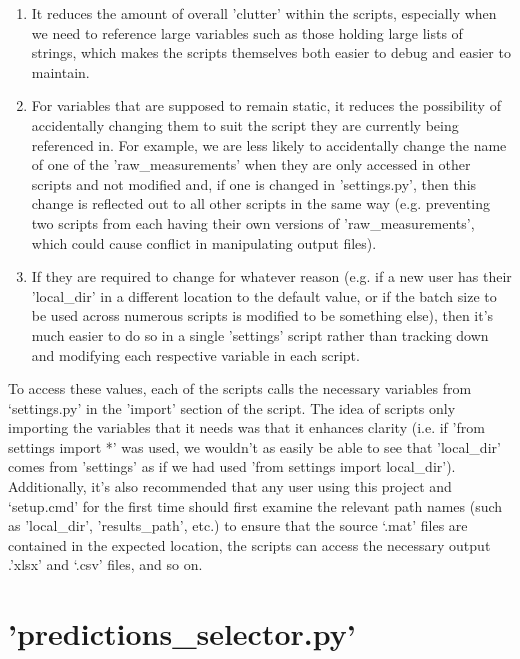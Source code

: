\documentclass[12pt,twoside]{report}
\begin{document}
\begin{enumerate}
	\item It reduces the amount of overall 'clutter' within the scripts, especially when we need to reference large variables such as those holding large lists of strings, which makes the scripts themselves both easier to debug and easier to maintain.
	\item For variables that are supposed to remain static, it reduces the possibility of accidentally changing them to suit the script they are currently being referenced in. For example, we are less likely to accidentally change the name of one of the 'raw\_measurements' when they are only accessed in other scripts and not modified and, if one is changed in 'settings.py', then this change is reflected out to all other scripts in the same way (e.g. preventing two scripts from each having their own versions of 'raw\_measurements', which could cause conflict in manipulating output files).
	\item If they are required to change for whatever reason (e.g. if a new user has their 'local\_dir' in a different location to the default value, or if the batch size to be used across numerous scripts is modified to be something else), then it's much easier to do so in a single 'settings' script rather than tracking down and modifying each respective variable in each script.
\end{enumerate}

\quad To access these values, each of the scripts calls the necessary variables from ‘settings.py’ in the 'import' section of the script. The idea of scripts only importing the variables that it needs was that it enhances clarity (i.e. if 'from settings import *' was used, we wouldn't as easily be able to see that 'local\_dir' comes from 'settings' as if we had used 'from settings import local\_dir'). Additionally, it's also recommended that any user using this project and ‘setup.cmd’ for the first time should first examine the relevant path names (such as 'local\_dir', 'results\_path', etc.) to ensure that the source ‘.mat’ files are contained in the expected location, the scripts can access the necessary output .’xlsx’ and ‘.csv’ files, and so on.




\section{'predictions\_selector.py'}

\end{document}
